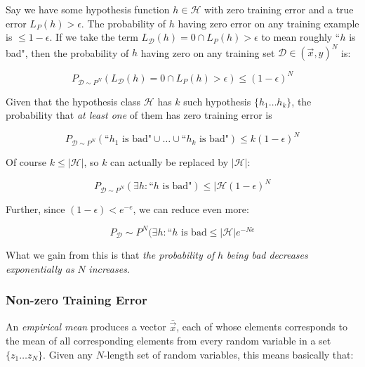 \documentclass[fleqn]{article}
\begin{document}
Say we have some hypothesis function $h \in \mathcal{H}$ with zero training error and a true error $L_P(h) > \epsilon$. The probability of $h$ having zero error on any training example is $\le 1 - \epsilon$. If we take the term $L_{\mathcal{D}}(h) = 0 \cap L_P(h) > \epsilon$ to mean roughly ``$h$ is bad", then the probability of $h$ having zero on any training set $\mathcal{D} \in (\vec{x}, y)^N$ is:

\begin{equation*}
P_{\mathcal{D} \sim P^N}(L_\mathcal{D}(h) = 0 \cap L_{P}(h) > \epsilon) \le (1 - \epsilon)^N
\end{equation*}

Given that the hypothesis class $\mathcal{H}$ has $k$ such hypothesis $\{h_1 \ldots h_k\}$, the probability that \textit{at least one} of them has zero training error is

\begin{equation*}
P_{\mathcal{D} \sim P^N}(\text{``}h_1\text{ is bad"} \cup \ldots \cup \text{``}h_k \text{ is bad"}) \le k(1-\epsilon)^N
\end{equation*}

Of course $k \le |\mathcal{H}|$, so $k$ can actually be replaced by $|\mathcal{H}|$:

\begin{equation*}
P_{\mathcal{D} \sim P^N}(\exists h : \text{``} h \text{ is bad"}) \le |\mathcal{H}(1-\epsilon)^N
\end{equation*}

Further, since $(1-\epsilon) < e^{-e}$, we can reduce even more:

\begin{equation*}
P_{\mathcal{D}} \sim P^N(\exists h : \text{``} h \text{ is bad} \le |\mathcal{H}| e^{-Ne}
\end{equation*}

What we gain from this is that \textit{the probability of} $h$ \textit{being bad decreases exponentially as} $N$ \textit{increases}.

\subsubsection*{Non-zero Training Error}

An \textit{empirical mean} produces a vector $\bar{\vec{x}}$, each of whose elements corresponds to the mean of all corresponding elements from every random variable in a set $\{z_1 \ldots z_N\}$. Given any $N$-length set of random variables, this means basically that:
\end{document}
